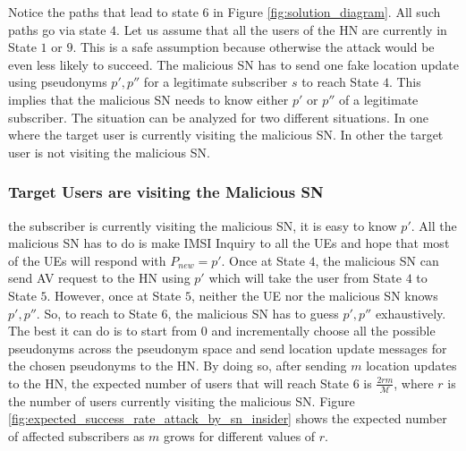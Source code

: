\documentclass{llncs} %
\begin{document}
Notice the paths that lead to state $6$ in Figure \ref{fig:solution_diagram}. All such paths go via state $4$. Let us assume that all the users of the HN are currently in State $1$ or $9$. This is a safe assumption because otherwise the attack would be even less likely to succeed. The malicious SN has to send one fake location update using pseudonyms $p',p''$ for a legitimate subscriber $s$ to reach State $4$. This implies that the malicious SN needs to know either $p'$ or $p''$ of a legitimate subscriber. The situation can be analyzed for two different situations. In one where the target user is currently visiting the malicious SN. In other the target user is not visiting the malicious SN.

\subsubsection{Target Users are visiting the Malicious SN} the subscriber is currently visiting the malicious SN, it is easy to know $p'$. All the malicious SN has to do is make IMSI Inquiry to all the UEs and hope that most of the UEs will respond with $P_{new} = p'$. Once at State $4$, the malicious SN can send AV request to the HN using $p'$ which will take the user from State $4$ to State $5$. However, once at State $5$, neither the UE nor the malicious SN knows $p',p''$. So, to reach to State $6$, the malicious SN has to guess $p',p''$ exhaustively. The best it can do is to start from $0$ and incrementally choose all the possible pseudonyms across the pseudonym space and send location update messages for the chosen pseudonyms to the HN. By doing so, after sending $m$ location updates to the HN, the expected number of users that will reach State $6$ is $\frac{2rm}{\mathcal{M}}$, where $r$ is the number of users currently visiting the malicious SN. Figure \ref{fig:expected_success_rate_attack_by_sn_insider} shows the expected number of affected subscribers as $m$ grows for different values of $r$.
\end{document}
